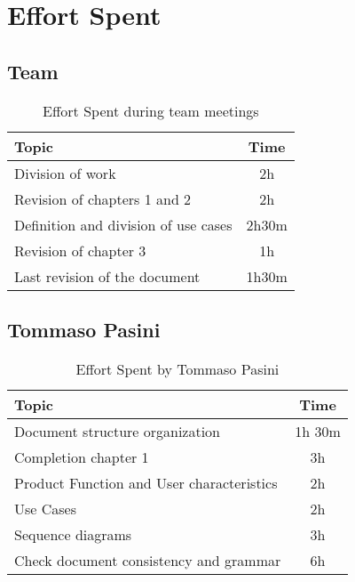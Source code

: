 \chapter{Effort Spent}

\section*{Team}


\begin{table}[H]
    \renewcommand{\arraystretch}{1.5}
    \centering
    \begin{tabular}{|l|c|}
        \hline
        \textbf{Topic}                       & \textbf{Time} \\ \hline
        Division of work                     & 2h            \\ \hline
        Revision of chapters 1 and 2         & 2h            \\ \hline
        Definition and division of use cases & 2h30m         \\ \hline
        Revision of chapter 3                & 1h            \\ \hline
        Last revision of the document        & 1h30m         \\ \hline
    \end{tabular}
    \caption{Effort Spent during team meetings}
    \label{tab:group-effort-spent}
\end{table}

\section*{Tommaso Pasini}
\begin{table}[H]
    \renewcommand{\arraystretch}{1.5}
    \centering
    \begin{tabular}{|l|c|}
        \hline
        \textbf{Topic}                              & \textbf{Time} \\ \hline
        Document structure organization             & 1h 30m        \\ \hline
        Completion chapter 1                        & 3h            \\ \hline
        Product Function and User characteristics   & 2h            \\ \hline
        Use Cases                                   & 2h            \\ \hline
        Sequence diagrams                           & 3h            \\ \hline
        Check document consistency and grammar      & 6h            \\ \hline
    \end{tabular}
    \caption{Effort Spent by Tommaso Pasini}
    \label{tab:pasini-effort-spent}
\end{table}

